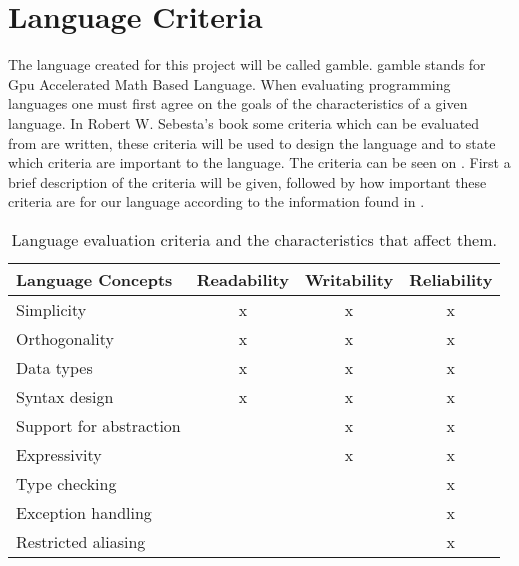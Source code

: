 \chapter{Language Criteria} %
\label{cha:language_criteria}
The language created for this project will be called \gls{gamble}.
\gls{gamble} stands for Gpu Accelerated Math Based Language.
When evaluating programming languages one must first agree on the goals of the characteristics of a given language.
In Robert W. Sebesta's book some criteria which can be evaluated from are written, these criteria will be used to design the language and to state which criteria are important to the language. \citep{Sebesta}
The criteria can be seen on .
First a brief description of the criteria will be given, followed by how important these criteria are for our language according to the information found in .
\begin{table}[h]
	\centering
	\begin{tabular}{|l|c|c|c|}
	\hline
	\textbf{Language Concepts} & \textbf{Readability}  & \textbf{Writability} & \textbf{Reliability}   \\ \hline
	Simplicity                 & x      		       & x             		  & x           		   \\ \hline
	Orthogonality              & x 				       & x             		  & x           		   \\ \hline
	Data types                 & x 				       & x             		  & x           		   \\ \hline
	Syntax design              & x 				       & x             		  & x           		   \\ \hline
	Support for abstraction    &                       & x             		  & x           		   \\ \hline
	Expressivity               &                       & x             		  & x           		   \\ \hline
	Type checking              &                       &               		  & x           		   \\ \hline
	Exception handling         &                       &               		  & x           		   \\ \hline
	Restricted aliasing        &                       &               		  & x           		   \\ \hline
	\end{tabular}
	\caption{Language evaluation criteria and the characteristics that affect them.}\label{tbl:concepts}
\end{table}

